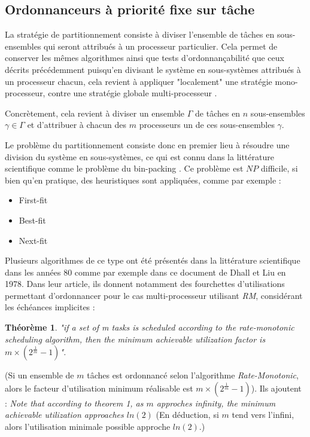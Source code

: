 \documentclass[11pt,a4paper,oneside]{report}
\newtheorem{mytheorem}{Théorème}
\begin{document}
	\subsection{Ordonnanceurs à priorité fixe sur tâche}
	
	La stratégie de partitionnement consiste à diviser l'ensemble de tâches en sous-ensembles qui seront 
	attribués à un processeur particulier. Cela permet de conserver les mêmes algorithmes ainsi 
	que tests d'ordonnançabilité que ceux 
	décrits précédemment puisqu'en divisant le système en sous-systèmes attribués à un 
	processeur chacun, cela revient à appliquer "localement" une stratégie mono-processeur, contre 
	une stratégie globale multi-processeur \cite{ndoye_ordonnancement_2014}.
	
	Concrètement, cela revient à diviser un ensemble $\Gamma$ de tâches en $n$ sous-ensembles 
	$\gamma \in \Gamma$ et d'attribuer à chacun des $m$ processeurs un de ces sous-ensembles $\gamma$.\medskip
	
	
	Le problème du partitionnement consiste donc en premier lieu 
	à résoudre une division du système en sous-systèmes, ce qui est connu dans la 
	littérature scientifique comme le problème du bin-packing \cite{ausiello_approximation_1984}.
	Ce problème est $NP$ difficile, si bien qu'en pratique, 
	des heuristiques sont appliquées, comme par exemple :\medskip
	\begin{itemize}
		\item First-fit 
		\item Best-fit
		\item Next-fit
	\end{itemize}
	
	Plusieurs algorithmes de ce type ont été présentés dans la littérature scientifique
	dans les années 80 comme par exemple \cite{dhall_real-time_1978} dans ce 
	document de Dhall et Liu en 1978. 
	Dans leur article, ils donnent notamment des fourchettes d'utilisations 
	permettant d'ordonnancer pour le cas multi-processeur utilisant \textit{RM}, 
	considérant les échéances implicites :
	\begin{mytheorem}
		\textit{"if a set of m tasks is scheduled according to the rate-monotonic scheduling algorithm, then the minimum achievable utilization factor is $m\times(2^{\frac{1}{m}} - 1)$".}
	\end{mytheorem}
	(Si un ensemble de $m$ tâches est ordonnancé selon l'algorithme \textit{Rate-Monotonic}, 
	alors le facteur d'utilisation minimum réalisable est $m\times(2^{\frac{1}{m}} - 1)$). \medskip
	Ils ajoutent :\medskip
	\textit{Note that according to theorem 1, as $m$ approches infinity, 
		the minimum achievable utilization approaches $ln(2)$}
	(En déduction, si $m$ tend vers l'infini, alors l'utilisation minimale possible approche $ln(2)$.) \medskip
	
\end{document}
